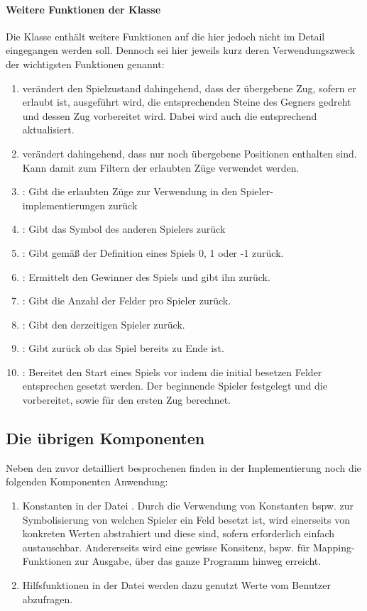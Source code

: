 \paragraph{Weitere Funktionen der Klasse }
Die Klasse  enthält weitere Funktionen auf die hier jedoch nicht im Detail eingegangen werden soll. Dennoch sei hier jeweils kurz deren Verwendungszweck der wichtigsten Funktionen genannt:
\begin{enumerate}
\item {} verändert den Spielzustand dahingehend, dass der übergebene Zug, sofern er erlaubt ist, ausgeführt wird, die entsprechenden Steine des Gegners gedreht und dessen Zug vorbereitet wird. Dabei wird auch die  entsprechend aktualisiert.
\item {} verändert  dahingehend, dass nur noch übergebene Positionen enthalten sind. Kann damit zum Filtern der erlaubten Züge verwendet werden.
\item {}: Gibt die erlaubten Züge zur Verwendung in den Spieler-\\implementierungen zurück
\item {}: Gibt das Symbol des anderen Spielers zurück
\item {}: Gibt gemäß der Definition eines Spiels 0, 1 oder -1 zurück.
\item {}: Ermittelt den Gewinner des Spiels und gibt ihn zurück.
\item {}: Gibt die Anzahl der Felder pro Spieler zurück.
\item {}: Gibt den derzeitigen Spieler zurück.
\item {}: Gibt zurück ob das Spiel bereits zu Ende ist.
\item {}: Bereitet den Start eines Spiels vor indem die initial besetzen Felder entsprechen gesetzt werden. Der beginnende Spieler festgelegt und die   vorbereitet, sowie  für den ersten Zug berechnet.
\end{enumerate}
\subsection{Die übrigen Komponenten}
Neben den zuvor detailliert besprochenen finden in der Implementierung noch die folgenden Komponenten Anwendung: 
\begin{enumerate}
\item Konstanten in der Datei . Durch die Verwendung von Konstanten bspw. zur Symbolisierung von welchen Spieler ein Feld besetzt ist, wird einerseits von konkreten Werten abstrahiert und diese sind, sofern erforderlich einfach austauschbar. Andererseits wird eine gewisse Konsitenz, bspw. für Mapping-Funktionen zur Ausgabe, über das ganze Programm hinweg erreicht.
\item Hilfsfunktionen in der Datei  werden dazu genutzt Werte vom Benutzer abzufragen.
\end{enumerate}
